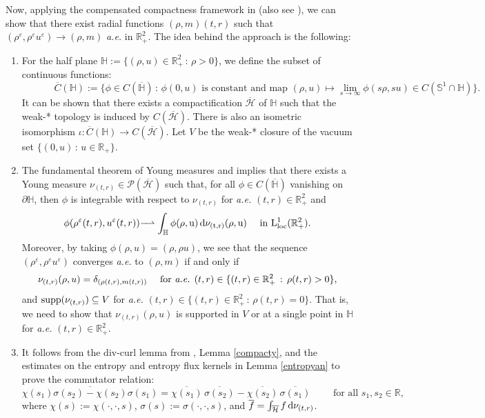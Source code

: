 \documentclass[reqno,11pt]{amsart}
\numberwithin{equation}{section}
\theoremstyle{definition}
\def\v{\varepsilon}
\def\dd{{\, \rm d}}
\def\supp{{\rm supp}}
\newcommand{\longrightharpoonup}{\rm - \!\!\! \rightharpoonup}
\begin{document}
Now, applying the compensated compactness framework in \cite[\S 8]{Chen_2024} 
(also see \cite[\S 4]{Schrecker_2019}),
we can show that there exist radial functions $(\rho,m)(t,r)$ such that
$(\rho^\v,\rho^\v u^\v) \to (\rho,m)$ {\it a.e.} in $\mathbb{R}^2_+$. 
The idea behind the approach is the following:
\begin{enumerate}
    \item[\rm (i)] For the half plane 
    $\mathbb{H} := \{ (\rho,u)\in \mathbb{R}^2_+ \, : \, \rho>0 \}$,
    we define the subset of continuous functions:
    \[
    \qquad\quad\,\, \overline{C}(\mathbb{H}) := \{ \phi \in C(\overline{\mathbb{H}})\, : \, \phi(0,u) \text{ is constant 
    and map } (\rho,u) \mapsto \lim_{s \to \infty} \phi(s\rho,su) \in C(\mathbb{S}^1 \cap \mathbb{H}) \}.
    \]
    It can be shown that there exists a compactification $\overline{\mathcal{H}}$ of $\mathbb{H}$
    such that the weak-* topology is induced by $C(\overline{\mathcal{H}})$. 
    There is also an isometric isomorphism $\iota : \overline{C}(\mathbb{H}) \to C(\overline{\mathcal{H}})$. 
    Let $V$ be the weak-* closure of the vacuum set $\{(0,u) \, : \, u \in \mathbb{R}_+ \}$.

    \vspace{0.3cm}
    \item[\rm (ii)] The fundamental theorem of Young measures \cite[Theorem 2.4]{Alberti_2001} and
    \cite[Proposition 4.1]{Schrecker_2019} implies that there exists a Young measure 
    $\nu_{(t,r)} \in \mathcal{P}(\overline{\mathcal{H}})$ such that, 
    for all $\phi \in C(\overline{\mathbb{H}})$ vanishing on $\partial \mathbb{H}$, 
    then $\phi$ is integrable with respect to $\nu_{(t,r)}$ for {\it a.e.} $(t,r) \in \mathbb{R}^2_+$ and
    \[
 \phi(\rho^\v(t,r),u^\v(t,r)) \longrightharpoonup \int_{\mathbb{H}} \phi(\rho,u) \dd \nu_{(t,r)}(\rho,u) \quad \text{ in } L^1_{\rm loc}(\mathbb{R}^2_+).
    \]
    Moreover, by taking $\phi(\rho,u) = (\rho,\rho u)$, we see that the sequence $(\rho^\v,\rho^\v u^\v)$ converges {\it a.e.} to $(\rho,m)$ if and only if
    \[
 \nu_{(t,r)}(\rho,u) = \delta_{(\rho(t,r),m(t,r))} \quad \text{ for {\it a.e.} } (t,r) \in \{ (t,r) \in \mathbb{R}^2_+ \, : \, \rho(t,r) > 0 \},
    \]
    and $\supp (\nu_{(t,r)}) \subseteq V$ for 
    {\it a.e.} $(t,r) \in \{ (t,r) \in \mathbb{R}^2_+ \, : \, \rho(t,r) = 0 \}$.
    That is, we need to show that $\nu_{(t,r)}(\rho,u)$ is supported in $V$ or at a single point in $\mathbb{H}$ for {\it a.e.} $(t,r) \in \mathbb{R}^2_+$.

    \vspace{0.3cm}
    \item[\rm (iii)] It follows from the div-curl lemma from \cite[Theorem]{Conti_2011}, Lemma \ref{compacty}, 
    and the estimates on the entropy and entropy flux kernels in Lemma \ref{entropyan} 
    to prove the commutator relation:
    \[
     \overline{\chi(s_1) \sigma(s_2) - \chi(s_2) \sigma(s_1)} = \overline{\chi(s_1)} \, \overline{\sigma(s_2)} - \overline{\chi(s_2)} \, \overline{\sigma(s_1)} \qquad \text{ for all } s_1,s_2 \in \mathbb{R},
    \]
    where $\chi(s) := \chi(\cdot,\cdot,s)$, $\sigma(s) := \sigma(\cdot,\cdot,s)$, 
    and $\overline{f} = \int_{\overline{\mathcal{H}}} f \dd \nu_{(t,r)}$.


\end{enumerate}
\end{document}
